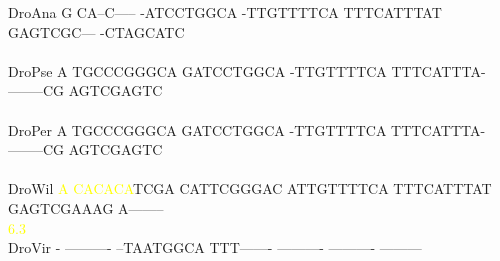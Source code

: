 \documentclass[11pt,twoside,reqno,a4paper]{article}
\begin{document}
{DroAna	G	CA--C-----	-ATCCTGGCA	-TTGTTTTCA	TTTCATTTAT	GAGTCGC---	-CTAGCATC\\
\hspace*{7\charwidth}\hspace*{1\charwidth}\hspace*{1\charwidth}\hspace*{1\charwidth}\hspace*{1\charwidth}\hspace*{1\charwidth}\hspace*{1\charwidth}\\
DroPse	A	TGCCCGGGCA	GATCCTGGCA	-TTGTTTTCA	TTTCATTTA-	--------CG	AGTCGAGTC\\
\hspace*{7\charwidth}\hspace*{1\charwidth}\hspace*{1\charwidth}\hspace*{1\charwidth}\hspace*{1\charwidth}\hspace*{1\charwidth}\hspace*{1\charwidth}\\
DroPer	A	TGCCCGGGCA	GATCCTGGCA	-TTGTTTTCA	TTTCATTTA-	--------CG	AGTCGAGTC\\
\hspace*{7\charwidth}\hspace*{1\charwidth}\hspace*{1\charwidth}\hspace*{1\charwidth}\hspace*{1\charwidth}\hspace*{1\charwidth}\hspace*{1\charwidth}\\
DroWil	\textcolor{Yellow}{A}	\textcolor{Yellow}{C}\textcolor{Yellow}{A}\textcolor{Yellow}{C}\textcolor{Yellow}{A}\textcolor{Yellow}{C}\textcolor{Yellow}{A}TCGA	CATTCGGGAC	ATTGTTTTCA	TTTCATTTAT	GAGTCGAAAG	A--------\\
\hspace*{7\charwidth}\hspace*{0\charwidth}\textcolor{Yellow}{6.3}\hspace*{1\charwidth}\hspace*{1\charwidth}\hspace*{1\charwidth}\hspace*{1\charwidth}\hspace*{1\charwidth}\hspace*{1\charwidth}\\
DroVir	-	----------	--TAATGGCA	TTT-------	----------	----------	---------\\
}
\end{document}
